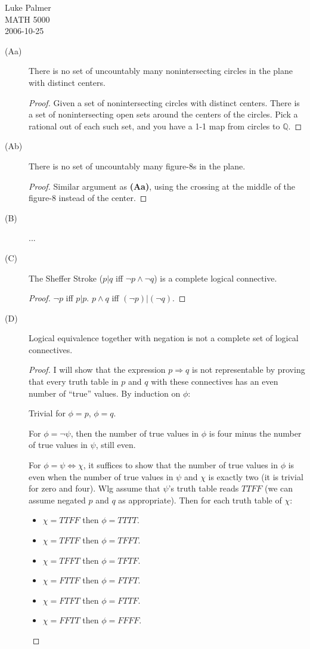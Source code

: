 \documentclass[12pt]{article}
\begin{document}
\noindent Luke Palmer \\
MATH 5000 \\
2006-10-25

\begin{description}
\item[(Aa)] There is no set of uncountably many nonintersecting circles
in the plane with distinct centers.
  \begin{proof}
  Given a set of nonintersecting circles with distinct centers.  There
  is a set of nonintersecting open sets around the centers of the
  circles.  Pick a rational out of each such set, and you have a 1-1 map
  from circles to $\mathbb{Q}$.
  \end{proof}

\item[(Ab)] There is no set of uncountably many figure-8s in the plane.
  \begin{proof}
  Similar argument as \textbf{(Aa)}, using the crossing at the middle of
  the figure-8 instead of the center.
  \end{proof}

\item[(B)] ...

\item[(C)] The Sheffer Stroke ($p|q$ iff $\neg p \wedge \neg q$) is a
complete logical connective.
  \begin{proof}
  $\neg p$ iff $p|p$.  $p \wedge q$ iff $(\neg p)|(\neg q)$.
  \end{proof}

\item[(D)] Logical equivalence together with negation is not a complete
set of logical connectives.
  \begin{proof}
  I will show that the expression $p \Rightarrow q$ is not representable
  by proving that every truth table in $p$ and $q$ with these
  connectives has an even number of ``true'' values.  By induction on
  $\phi$:

  Trivial for $\phi = p$, $\phi = q$.

  For $\phi = \neg \psi$, then the number of true values in $\phi$ is
  four minus the number of true values in $\psi$, still even.

  For $\phi = \psi \Leftrightarrow \chi$, it suffices to show that the
  number of true values in $\phi$ is even when the number of true values
  in $\psi$ and $\chi$ is exactly two (it is trivial for zero and four).
  Wlg assume that $\psi$'s truth table reads $TTFF$ (we can assume
  negated $p$ and $q$ as appropriate).  Then for each truth table of
  $\chi$:
  \begin{itemize}
  \item $\chi = TTFF$ then $\phi = TTTT$.
  \item $\chi = TFTF$ then $\phi = TFFT$.
  \item $\chi = TFFT$ then $\phi = TFTF$.
  \item $\chi = FTTF$ then $\phi = FTFT$.
  \item $\chi = FTFT$ then $\phi = FTTF$.
  \item $\chi = FFTT$ then $\phi = FFFF$.
  \end{itemize}


\end{proof}
\end{description}
\end{document}
